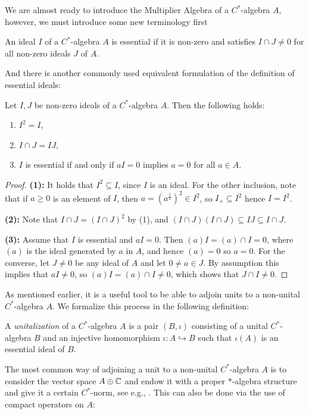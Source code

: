 We are almost ready to introduce the Multiplier Algebra of a $C^*$-algebra $A$, however, we must introduce some new terminology first
\begin{definition}
	An ideal $I$ of a $C^*$-algebra $A$ is essential if it is non-zero and satisfies $I\cap J \neq 0$ for all non-zero ideals $J$ of $A$.
\end{definition}
And there is another commonly used equivalent formulation of the definition of essential ideals:
\begin{lemma}
	Let $I,J$ be non-zero ideals of a $C^*$-algebra $A$. Then the following holds:
	\begin{enumerate}
		\item $I^2 = I$,
		\item $I\cap J = IJ$,
		\item $I$ is essential if and only if $aI=0$ implies $a = 0$ for all $ a \in A$.
	\end{enumerate}
\end{lemma}
\begin{proof}
	\textbf{(1):} It holds that $I^2 \subseteq I$, since $I$ is an ideal. For the other inclusion, note that if $a \geq 0 $ is an element of $I$, then $a=(a^{\frac12})^2 \in I^2$, so $I_+ \subseteq I^2$ hence $I=I^2$.

	\textbf{(2):} Note that $I \cap J = (I \cap J )^2$ by (1), and $(I\cap J) (I\cap J) \subseteq IJ \subseteq I \cap J$.

	\textbf{(3):} Assume that $I$ is essential and $aI = 0$. Then $(a)I=(a)\cap I = 0$, where $(a)$ is the ideal generated by $a$ in $A$, and hence $(a)=0$ so $a = 0$. For the converse, let $J \neq 0$ be any ideal of $A$ and let $0 \neq a \in J$. By assumption this implies that $aI \neq 0$, so $(a)I=(a)\cap I \neq 0$, which shows that $J \cap I \neq 0$.
\end{proof}
As mentioned earlier, it is a useful tool to be able to adjoin units to a non-unital $C^*$-algebra $A$. We formalize this process in the following definition:
\begin{definition}
	A \emph{unitalization} of a $C^*$-algebra $A$ is a pair $(B,\iota)$ consisting of a unital $C^*$-algebra $B$ and an injective homomorphism $\iota \colon A \hookrightarrow B$ such that $\iota(A)$ is an essential ideal of $B$.	
\end{definition}
The most common way of adjoining a unit to a non-unital $C^*$-algebra $A$ is to consider the vector space $A\oplus \mathbb{C}$ and endow it with a proper $*$-algebra structure and give it a certain $C^*$-norm, see e.g., \cite[Theorem 15.1]{zhu}. This can also be done via the use of compact operators on $A$:
